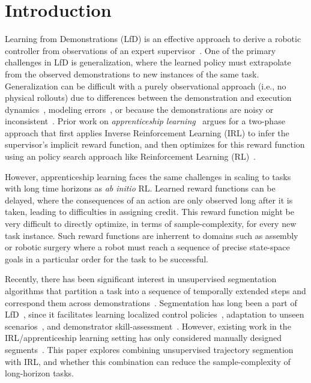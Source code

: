 \section{Introduction}
Learning from Demonstrations (LfD) is an effective approach to derive a robotic controller from observations of an expert supervisor~\cite{argall2009survey}.
One of the primary challenges in LfD is generalization, where the learned policy must extrapolate from the observed demonstrations to new instances of the same task.
Generalization can be difficult with a purely observational approach (i.e., no physical rollouts) due to differences between the demonstration and execution dynamics~\cite{abbeel2004apprenticeship}, modeling errors~\cite{ross2011reduction}, or because the demonstrations are noisy or inconsistent~\cite{krishnan2015tsc}.
Prior work on \emph{apprenticeship learning}~\cite{DBLP:conf/nips/KolterAN07, coates2008learning, abbeel2004apprenticeship} argues for a two-phase approach that first applies Inverse Reinforcement Learning (IRL) to infer the supervisor's implicit reward function, and then optimizes for this reward function using an policy search approach like Reinforcement Learning (RL)~\cite{ng2000algorithms, abbeel2004apprenticeship}.

However, apprenticeship learning faces the same challenges in scaling to tasks with long time horizons as \emph{ab initio} RL.
Learned reward functions can be delayed, where the consequences of an action are only observed long after it is taken, leading to difficulties in assigning credit.
This reward function might be very difficult to directly optimize, in terms of sample-complexity, for every new task instance.
Such reward functions are inherrent to domains such as assembly or robotic surgery where a robot must reach a sequence of precise state-space goals in a particular order for the task to be successful.
 
Recently, there has been significant interest in unsupervised segmentation algorithms that partition a task into a sequence of temporally extended steps and correspond them across demonstrations~\citep{barbivc2004segmenting, chiappa2010movement,  alvarez2010switched,calinon2010learning, kruger2012imitation, niekum2012learning, wachter2015hierarchical, lee2015autonomous}.
Segmentation has long been a part of LfD~\citep{argall2009survey}, since it facilitates learning localized control policies~\citep{murali2015learning, niekum2012learning, konidaris2011robot}, adaptation to unseen scenarios~\citep{ijspreet2002learning, ude2010task}, and demonstrator skill-assessment~\citep{reiley2010motion, gao2014jigsaws}.
However, existing work in the IRL/apprenticeship learning setting has only considered manually designed segments~\cite{DBLP:conf/nips/KolterAN07}.
This paper explores combining unsupervised trajectory segmention with IRL, and whether this combination can reduce the sample-complexity of long-horizon tasks.

